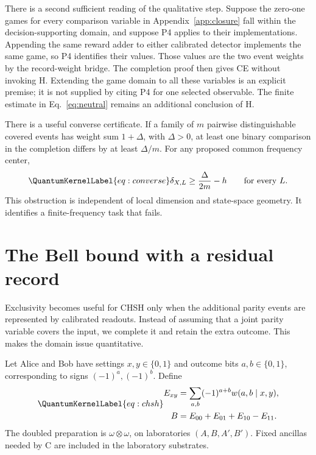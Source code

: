 \documentclass[a4paper,11pt,twocolumn,unpublished]{quantumarticle}
\let\label\QuantumKernelLabel
\begin{document}
There is a second sufficient reading of the qualitative step. Suppose the zero-one games for every comparison variable in Appendix~\ref{app:closure} fall within the decision-supporting domain, and suppose P4 applies to their implementations. Appending the same reward adder to either calibrated detector implements the same game, so P4 identifies their values. Those values are the two event weights by the record-weight bridge. The completion proof then gives CE without invoking H. Extending the game domain to all these variables is an explicit premise; it is not supplied by citing P4 for one selected observable. The finite estimate in Eq.~\eqref{eq:neutral} remains an additional conclusion of H.

There is a useful converse certificate. If a family of $m$ pairwise distinguishable covered events has weight sum $1+\Delta$, with $\Delta>0$, at least one binary comparison in the completion differs by at least $\Delta/m$. For any proposed common frequency center,
\begin{equation}\label{eq:converse}
 \delta_{X,L}\geq\frac{\Delta}{2m}-h\qquad\text{for every }L.
\end{equation}
This obstruction is independent of local dimension and state-space geometry. It identifies a finite-frequency task that fails.

\section{The Bell bound with a residual record}
Exclusivity becomes useful for CHSH only when the additional parity events are represented by calibrated readouts. Instead of assuming that a joint parity variable covers the input, we complete it and retain the extra outcome. This makes the domain issue quantitative.

Let Alice and Bob have settings $x,y\in\{0,1\}$ and outcome bits $a,b\in\{0,1\}$, corresponding to signs $(-1)^a,(-1)^b$. Define
\begin{equation}\label{eq:chsh}
\begin{aligned}
 E_{xy}&=\sum_{a,b}(-1)^{a+b}w(a,b\mid x,y),\\
 B&=E_{00}+E_{01}+E_{10}-E_{11}.
\end{aligned}
\end{equation}
The doubled preparation is $\omega\otimes\omega$, on laboratories $(A,B,A',B')$. Fixed ancillas needed by C are included in the laboratory substrates.
\end{document}

